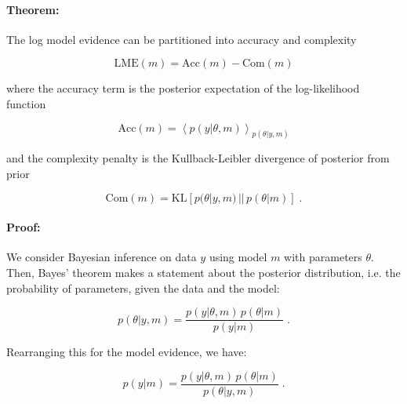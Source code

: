 

\setcounter{equation}{0}



\paragraph{Theorem:}

The log model evidence can be partitioned into accuracy and complexity

\begin{equation} \label{eq:LME}
\mathrm{LME}(m) = \mathrm{Acc}(m) - \mathrm{Com}(m)
\end{equation}

where the accuracy term is the posterior expectation of the log-likelihood function

\begin{equation} \label{eq:Acc}
\mathrm{Acc}(m) = \left\langle p(y|\theta,m) \right\rangle_{p(\theta|y,m)}
\end{equation}

and the complexity penalty is the Kullback-Leibler divergence of posterior from prior

\begin{equation} \label{eq:Com}
\mathrm{Com}(m) = \mathrm{KL} \left[ p(\theta|y,m) \, || \, p(\theta|m) \right] \; .
\end{equation}


\paragraph{Proof:} We consider Bayesian inference on data $y$ using model $m$ with parameters $\theta$. Then, Bayes' theorem makes a statement about the posterior distribution, i.e. the probability of parameters, given the data and the model:

\begin{equation} \label{eq:AnC-s1}
p(\theta|y,m) = \frac{p(y|\theta,m) \, p(\theta|m)}{p(y|m)} \; .
\end{equation}

Rearranging this for the model evidence, we have:

\begin{equation} \label{eq:AnC-s2}
p(y|m) = \frac{p(y|\theta,m) \, p(\theta|m)}{p(\theta|y,m)} \; .
\end{equation}

